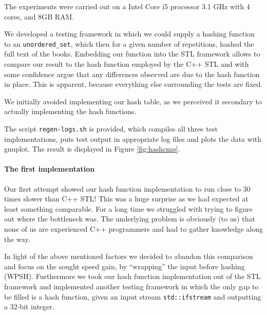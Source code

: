 \documentclass[]{article}
\newcommand{\funk}[1]{\texttt{\small #1}}
\newcommand{\cpp}{C+\!+\xspace}
\begin{document}
The experiments were carried out on a Intel Core i5 processor 3.1 GHz with 4 cores, and 8GB RAM.

We developed a testing framework in which we could supply a hashing function to an \funk{unordered\_set}, which then for a given number of repetitions, hashed the full text of the books. Embedding our function into the STL framework allows to compare our result to the hash function employed by the \cpp STL and with some confidence argue that any differences observed are due to the hash function in place. This is apparent, because everything else surrounding the tests are fixed.

We initially avoided implementing our hash table, as we perceived it secondary to actually implementing the hash functions.

The script \funk{regen-logs.sh} is provided, which compiles all three test implementations, puts test output in appropriate log files and plots the data with gnuplot. The result is displayed in Figure \ref{fig:hashcmp}.

\paragraph{The first implementation}

Our first attempt showed our hash function implementation to run close to 30 times slower than \cpp STL! This was a huge surprise as we had expected at least something comparable. For a long time we struggled with trying to figure out where the bottleneck was. The underlying problem is obviously (to us) that none of us are experienced \cpp programmers and had to gather knowledge along the way.

In light of the above mentioned factors we decided to abandon this comparison and focus on the sought speed gain, by ``wrapping'' the input before hashing (WPSH). Furthermore we took our hash function implementation out of the STL framework and implemented another testing framework in which the only gap to be filled is a hash function, given an input stream \funk{std::ifstream} and outputting a 32-bit integer.

\end{document}
